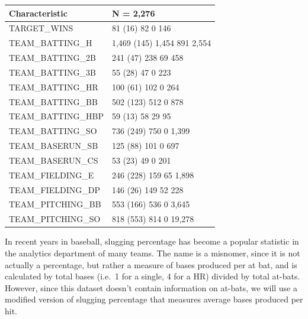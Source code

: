 \documentclass[
]{article}
\newenvironment{Shaded}{\begin{snugshade}}{\end{snugshade}}
\newcommand{\DecValTok}[1]{\textcolor[rgb]{0.00,0.00,0.81}{#1}}
\newcommand{\NormalTok}[1]{#1}
\newcommand{\OtherTok}[1]{\textcolor[rgb]{0.56,0.35,0.01}{#1}}
\newcommand{\SpecialCharTok}[1]{\textcolor[rgb]{0.00,0.00,0.00}{#1}}
\begin{document}
\begin{longtable}[]{@{}ll@{}}
\toprule
\textbf{Characteristic} & \textbf{N = 2,276}\tabularnewline
\midrule
\endhead
TARGET\_WINS & 81 (16) 82 0 146\tabularnewline
TEAM\_BATTING\_H & 1,469 (145) 1,454 891 2,554\tabularnewline
TEAM\_BATTING\_2B & 241 (47) 238 69 458\tabularnewline
TEAM\_BATTING\_3B & 55 (28) 47 0 223\tabularnewline
TEAM\_BATTING\_HR & 100 (61) 102 0 264\tabularnewline
TEAM\_BATTING\_BB & 502 (123) 512 0 878\tabularnewline
TEAM\_BATTING\_HBP & 59 (13) 58 29 95\tabularnewline
TEAM\_BATTING\_SO & 736 (249) 750 0 1,399\tabularnewline
TEAM\_BASERUN\_SB & 125 (88) 101 0 697\tabularnewline
TEAM\_BASERUN\_CS & 53 (23) 49 0 201\tabularnewline
TEAM\_FIELDING\_E & 246 (228) 159 65 1,898\tabularnewline
TEAM\_FIELDING\_DP & 146 (26) 149 52 228\tabularnewline
TEAM\_PITCHING\_BB & 553 (166) 536 0 3,645\tabularnewline
TEAM\_PITCHING\_SO & 818 (553) 814 0 19,278\tabularnewline
\bottomrule
\end{longtable}

In recent years in baseball, slugging percentage has become a popular
statistic in the analytics department of many teams. The name is a
misnomer, since it is not actually a percentage, but rather a measure of
bases produced per at bat, and is calculated by total bases (i.e.~1 for
a single, 4 for a HR) divided by total at-bats. However, since this
dataset doesn't contain information on at-bats, we will use a modified
version of slugging percentage that measures average bases produced per
hit.

\begin{Shaded}
\end{Shaded}
\end{document}

